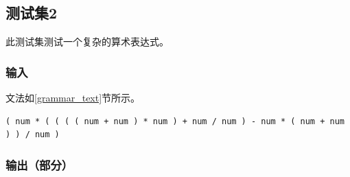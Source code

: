 \documentclass[lang=cn,11pt,a4paper,cite=authornum]{paper}
\begin{document}
\subsection{测试集2}

此测试集测试一个复杂的算术表达式。

\subsubsection{输入}

文法如\ref{grammar_text}节所示。

\begin{code}
\begin{verbatim}
( num * ( ( ( ( num + num ) * num ) + num / num ) - num * ( num + num ) ) / num )
\end{verbatim}
\end{code}

\subsubsection{输出（部分）}
\end{document}
